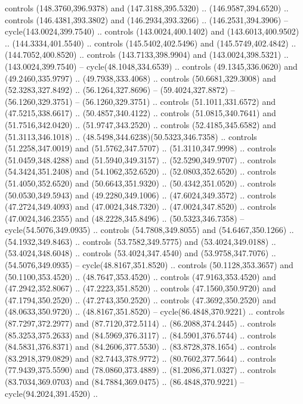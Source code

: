 \begin{scope}[cm={{1.25,0.0,0.0,-1.25,(0.0,743.43331)}}]
    controls (148.3760,396.9378) and (147.3188,395.5320) .. (146.9587,394.6520) ..
    controls (146.4381,393.3802) and (146.2934,393.3266) .. (146.2531,394.3906) --
    cycle(143.0024,399.7540) .. controls (143.0024,400.1402) and
    (143.6013,400.9502) .. (144.3334,401.5540) .. controls (145.5402,402.5496) and
    (145.5749,402.4842) .. (144.7052,400.8520) .. controls (143.7133,398.9904) and
    (143.0024,398.5321) .. (143.0024,399.7540) -- cycle(48.1048,334.6539) ..
    controls (49.1345,336.0620) and (49.2460,335.9797) .. (49.7938,333.4068) ..
    controls (50.6681,329.3008) and (52.3283,327.8492) .. (56.1264,327.8696) --
    (59.4024,327.8872) -- (56.1260,329.3751) -- (56.1260,329.3751) .. controls
    (51.1011,331.6572) and (47.5215,338.6617) .. (50.4857,340.4122) .. controls
    (51.0815,340.7641) and (51.7516,342.0420) .. (51.9747,343.2520) .. controls
    (52.4185,345.6582) and (51.3113,346.1018) ..
    (48.5498,344.6238)(50.5323,346.7358) .. controls (51.2258,347.0019) and
    (51.5762,347.5707) .. (51.3110,347.9998) .. controls (51.0459,348.4288) and
    (51.5940,349.3157) .. (52.5290,349.9707) .. controls (54.3424,351.2408) and
    (54.1062,352.6520) .. (52.0803,352.6520) .. controls (51.4050,352.6520) and
    (50.6643,351.9320) .. (50.4342,351.0520) .. controls (50.0530,349.5943) and
    (49.2280,349.1006) .. (47.6024,349.3572) .. controls (47.2724,349.4093) and
    (47.0024,348.7320) .. (47.0024,347.8520) .. controls (47.0024,346.2355) and
    (48.2228,345.8496) .. (50.5323,346.7358) -- cycle(54.5076,349.0935) ..
    controls (54.7808,349.8055) and (54.6467,350.1266) .. (54.1932,349.8463) ..
    controls (53.7582,349.5775) and (53.4024,349.0188) .. (53.4024,348.6048) ..
    controls (53.4024,347.4540) and (53.9758,347.7076) .. (54.5076,349.0935) --
    cycle(48.8167,351.8520) .. controls (50.1128,353.3657) and (50.1100,353.4520)
    .. (48.7647,353.4520) .. controls (47.9163,353.4520) and (47.2942,352.8067) ..
    (47.2223,351.8520) .. controls (47.1560,350.9720) and (47.1794,350.2520) ..
    (47.2743,350.2520) .. controls (47.3692,350.2520) and (48.0633,350.9720) ..
    (48.8167,351.8520) -- cycle(86.4848,370.9221) .. controls (87.7297,372.2977)
    and (87.7120,372.5114) .. (86.2088,374.2445) .. controls (85.3253,375.2633)
    and (84.5969,376.3117) .. (84.5901,376.5744) .. controls (84.5831,376.8371)
    and (84.2606,377.5530) .. (83.8728,378.1654) .. controls (83.2918,379.0829)
    and (82.7443,378.9772) .. (80.7602,377.5644) .. controls (77.9439,375.5590)
    and (78.0860,373.4889) .. (81.2086,371.0327) .. controls (83.7034,369.0703)
    and (84.7884,369.0475) .. (86.4848,370.9221) -- cycle(94.2024,391.4520) ..

\end{scope}

